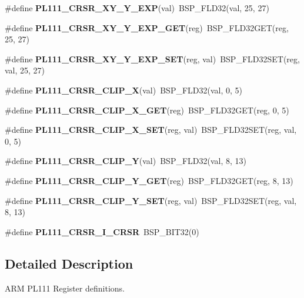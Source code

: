 \begin{DoxyCompactItemize}
\#define {\bfseries P\+L111\+\_\+\+C\+R\+S\+R\+\_\+\+X\+Y\+\_\+\+Y\+\_\+\+E\+XP}(val)~B\+S\+P\+\_\+\+F\+L\+D32(val, 25, 27)
\item 
\mbox{\label{arm-pl111-regs_8h_ad5b05094fe4c04267864f834cad9cba5}} 
\#define {\bfseries P\+L111\+\_\+\+C\+R\+S\+R\+\_\+\+X\+Y\+\_\+\+Y\+\_\+\+E\+X\+P\+\_\+\+G\+ET}(reg)~B\+S\+P\+\_\+\+F\+L\+D32\+G\+ET(reg, 25, 27)
\item 
\mbox{\label{arm-pl111-regs_8h_a2930dfa24486ce24420ca8e5548dd741}} 
\#define {\bfseries P\+L111\+\_\+\+C\+R\+S\+R\+\_\+\+X\+Y\+\_\+\+Y\+\_\+\+E\+X\+P\+\_\+\+S\+ET}(reg,  val)~B\+S\+P\+\_\+\+F\+L\+D32\+S\+ET(reg, val, 25, 27)
\item 
\mbox{\label{arm-pl111-regs_8h_a4cc3003ef6ac9eb6b1fe462585d93636}} 
\#define {\bfseries P\+L111\+\_\+\+C\+R\+S\+R\+\_\+\+C\+L\+I\+P\+\_\+X}(val)~B\+S\+P\+\_\+\+F\+L\+D32(val, 0, 5)
\item 
\mbox{\label{arm-pl111-regs_8h_a942cac87b363b500d76f694d20060c86}} 
\#define {\bfseries P\+L111\+\_\+\+C\+R\+S\+R\+\_\+\+C\+L\+I\+P\+\_\+\+X\+\_\+\+G\+ET}(reg)~B\+S\+P\+\_\+\+F\+L\+D32\+G\+ET(reg, 0, 5)
\item 
\mbox{\label{arm-pl111-regs_8h_ab500e21d925f6e9a95aefd84ffc232f1}} 
\#define {\bfseries P\+L111\+\_\+\+C\+R\+S\+R\+\_\+\+C\+L\+I\+P\+\_\+\+X\+\_\+\+S\+ET}(reg,  val)~B\+S\+P\+\_\+\+F\+L\+D32\+S\+ET(reg, val, 0, 5)
\item 
\mbox{\label{arm-pl111-regs_8h_a380617843e6c4802167536d320f73bfd}} 
\#define {\bfseries P\+L111\+\_\+\+C\+R\+S\+R\+\_\+\+C\+L\+I\+P\+\_\+Y}(val)~B\+S\+P\+\_\+\+F\+L\+D32(val, 8, 13)
\item 
\mbox{\label{arm-pl111-regs_8h_a7ceadfb3ade30f80c67b442e4d0af783}} 
\#define {\bfseries P\+L111\+\_\+\+C\+R\+S\+R\+\_\+\+C\+L\+I\+P\+\_\+\+Y\+\_\+\+G\+ET}(reg)~B\+S\+P\+\_\+\+F\+L\+D32\+G\+ET(reg, 8, 13)
\item 
\mbox{\label{arm-pl111-regs_8h_a9b76e8729b429548e8145be95f332c19}} 
\#define {\bfseries P\+L111\+\_\+\+C\+R\+S\+R\+\_\+\+C\+L\+I\+P\+\_\+\+Y\+\_\+\+S\+ET}(reg,  val)~B\+S\+P\+\_\+\+F\+L\+D32\+S\+ET(reg, val, 8, 13)
\item 
\mbox{\label{arm-pl111-regs_8h_a7446660b574e8fa391ea1d1e5766baf0}} 
\#define {\bfseries P\+L111\+\_\+\+C\+R\+S\+R\+\_\+\+I\+\_\+\+C\+R\+SR}~B\+S\+P\+\_\+\+B\+I\+T32(0)
\end{DoxyCompactItemize}


\subsection{Detailed Description}
A\+RM P\+L111 Register definitions. 

